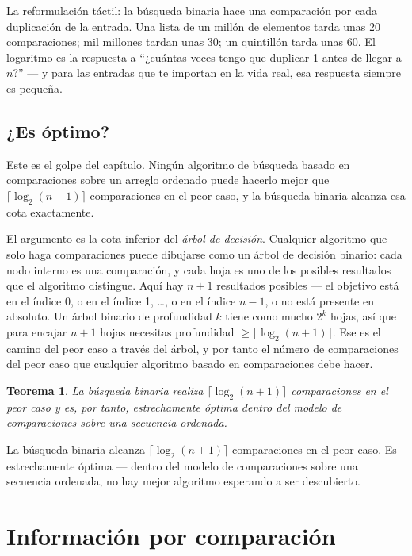 \documentclass[11pt,a4paper]{article}
\newtheorem{teorema}{Teorema}
\begin{document}
La reformulación táctil: la búsqueda binaria hace una comparación por cada duplicación de la entrada. Una lista de un millón de elementos tarda unas 20 comparaciones; mil millones tardan unas 30; un quintillón tarda unas 60. El logaritmo es la respuesta a ``¿cuántas veces tengo que duplicar 1 antes de llegar a $n$?'' --- y para las entradas que te importan en la vida real, esa respuesta siempre es pequeña.

\subsection*{¿Es óptimo?}

Este es el golpe del capítulo. Ningún algoritmo de búsqueda basado en comparaciones sobre un arreglo ordenado puede hacerlo mejor que $\lceil \log_2(n+1) \rceil$ comparaciones en el peor caso, y la búsqueda binaria alcanza esa cota exactamente.

El argumento es la cota inferior del \emph{árbol de decisión}. Cualquier algoritmo que solo haga comparaciones puede dibujarse como un árbol de decisión binario: cada nodo interno es una comparación, y cada hoja es uno de los posibles resultados que el algoritmo distingue. Aquí hay $n+1$ resultados posibles --- el objetivo está en el índice 0, o en el índice 1, \ldots, o en el índice $n-1$, o no está presente en absoluto. Un árbol binario de profundidad $k$ tiene como mucho $2^k$ hojas, así que para encajar $n+1$ hojas necesitas profundidad $\ge \lceil \log_2(n+1) \rceil$. Ese es el camino del peor caso a través del árbol, y por tanto el número de comparaciones del peor caso que cualquier algoritmo basado en comparaciones debe hacer.

\begin{teorema}
La búsqueda binaria realiza $\lceil \log_2(n+1) \rceil$ comparaciones en el peor caso y es, por tanto, estrechamente óptima dentro del modelo de comparaciones sobre una secuencia ordenada.
\end{teorema}

La búsqueda binaria alcanza $\lceil \log_2(n+1) \rceil$ comparaciones en el peor caso. Es estrechamente óptima --- dentro del modelo de comparaciones sobre una secuencia ordenada, no hay mejor algoritmo esperando a ser descubierto.

\section{Información por comparación}
\end{document}
